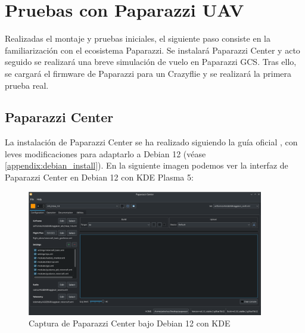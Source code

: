 
\section{Pruebas con Paparazzi UAV}

Realizadas el montaje y pruebas iniciales, el siguiente paso consiste en la familiarización con el ecosistema Paparazzi.
Se instalará Paparazzi Center y acto seguido se realizará una breve simulación de vuelo en Paparazzi GCS. 
Tras ello, se cargará el firmware de Paparazzi para un Crazyflie y se realizará la primera prueba real.


\subsection{Paparazzi Center}

La instalación de Paparazzi Center se ha realizado siguiendo la guía oficial \cite{paparazzi_center_install}, con leves modificaciones para adaptarlo a Debian 12 (véase \autoref{appendix:debian_install}). En la siguiente imagen podemos ver la interfaz de Paparazzi Center en Debian 12 con KDE Plasma 5: 

\begin{figure}[h]
    \centering
    \includegraphics[width=0.92\textwidth]{img/fig/fig2.5-paparazzi-center.png}
    \caption{Captura de Paparazzi Center bajo Debian 12 con KDE}
    \label{fig:paparazzi-center}
\end{figure}

